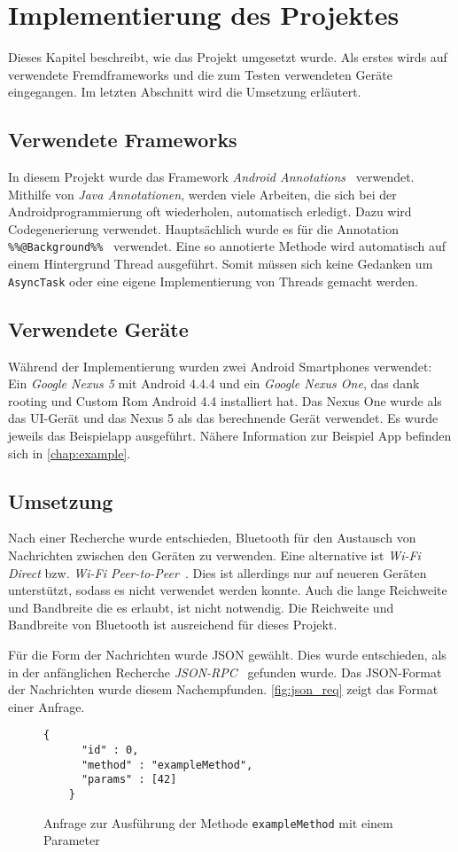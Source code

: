 \chapter{Implementierung des Projektes}\label{chap:impl}
%
Dieses Kapitel beschreibt, wie das Projekt umgesetzt wurde. Als erstes wirds auf verwendete Fremdframeworks und die zum Testen verwendeten Geräte eingegangen. Im letzten Abschnitt wird die Umsetzung erläutert.
%
\section{Verwendete Frameworks}
%
In diesem Projekt wurde das Framework \emph{Android Annotations}~\cite{Ricau2015} verwendet. Mithilfe von \emph{Java Annotationen}, werden viele Arbeiten, die sich bei der Androidprogrammierung oft wiederholen, automatisch erledigt. Dazu wird Codegenerierung verwendet. Hauptsächlich wurde es für die Annotation \lstinline|%%@Background%%|~\cite{Ricau2015a} verwendet. Eine so annotierte Methode wird automatisch auf einem Hintergrund Thread ausgeführt. Somit müssen sich keine Gedanken um \lstinline|AsyncTask| oder eine eigene Implementierung von Threads gemacht werden.
%
\section{Verwendete Geräte}
%
Während der Implementierung wurden zwei Android Smartphones verwendet: Ein \emph{Google Nexus 5} mit Android 4.4.4 und ein \emph{Google Nexus One}, das dank rooting und Custom Rom Android 4.4 installiert hat. Das Nexus One wurde als das UI-Gerät und das Nexus 5 als das berechnende Gerät verwendet. Es wurde jeweils das Beispielapp ausgeführt. Nähere Information zur Beispiel App befinden sich in \autoref{chap:example}.
%
\section{Umsetzung}
%
Nach einer Recherche wurde entschieden, Bluetooth für den Austausch von Nachrichten zwischen den Geräten zu verwenden. Eine alternative ist \emph{Wi-Fi Direct} bzw. \emph{Wi-Fi Peer-to-Peer}~\cite{GoogleInc.2015}. Dies ist allerdings nur auf neueren Geräten unterstützt, sodass es nicht verwendet werden konnte. Auch die lange Reichweite und Bandbreite die es erlaubt, ist nicht notwendig. Die Reichweite und Bandbreite von Bluetooth ist ausreichend für dieses Projekt.

Für die Form der Nachrichten wurde JSON gewählt. Dies wurde entschieden, als in der anfänglichen Recherche \emph{JSON-RPC}~\cite{JSON-RPCWorkingGroup2013} gefunden wurde. Das JSON-Format der Nachrichten wurde diesem Nachempfunden. \autoref{fig:json_req} zeigt das Format einer Anfrage.
\begin{figure}[htb]
  \centering
  \begin{lstlisting}[basicstyle=\ttfamily\scriptsize]
    {
      "id" : 0,
      "method" : "exampleMethod",
      "params" : [42]
    }
  \end{lstlisting}
  \caption{Anfrage zur Ausführung der Methode \lstinline|exampleMethod| mit einem Parameter}
  \label{fig:json_req}
\end{figure}

